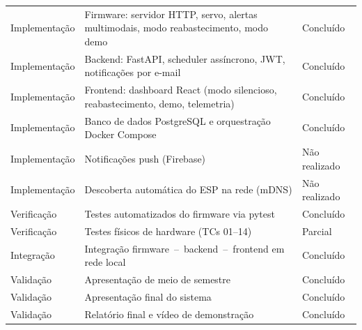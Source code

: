 \documentclass[12pt,a4paper]{article}
\newcommand{\lightrule}{\arrayrulecolor{gray!35}\midrule\arrayrulecolor{black}}
\begin{document}
\begin{longtable}{p{2.5cm}p{9.7cm}p{2.5cm}}
    \lightrule
    \small Implementação & \small Firmware: servidor HTTP, servo, alertas multimodais, modo reabastecimento, modo demo    & \small Concluído \\
    \lightrule
    \small Implementação & \small Backend: FastAPI, scheduler assíncrono, JWT, notificações por e-mail                   & \small Concluído \\
    \lightrule
    \small Implementação & \small Frontend: dashboard React (modo silencioso, reabastecimento, demo, telemetria)          & \small Concluído \\
    \lightrule
    \small Implementação & \small Banco de dados PostgreSQL e orquestração Docker Compose                                & \small Concluído \\
    \lightrule
    \small Implementação & \small Notificações push (Firebase)                                                          & \small Não realizado \\
    \lightrule
    \small Implementação & \small Descoberta automática do ESP na rede (mDNS)                                           & \small Não realizado \\
    \lightrule
    \small Verificação   & \small Testes automatizados do firmware via pytest                                           & \small Concluído \\
    \lightrule
    \small Verificação   & \small Testes físicos de hardware (TCs 01–14)                                                & \small Parcial \\
    \lightrule
    \small Integração    & \small Integração firmware~--~backend~--~frontend em rede local                              & \small Concluído \\
    \lightrule
    \small Validação     & \small Apresentação de meio de semestre                                                      & \small Concluído \\
    \lightrule
    \small Validação     & \small Apresentação final do sistema                                                         & \small Concluído \\
    \lightrule
    \small Validação     & \small Relatório final e vídeo de demonstração                                               & \small Concluído \\
    \bottomrule
\end{longtable}

\newpage

\end{document}
